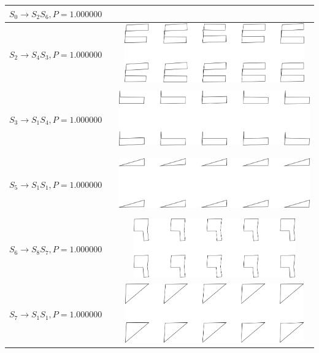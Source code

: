 \begin{tabular}{|l|c|c|}
\hline
$S_{0} \to S_{2} S_{6}, P=1.000000$ &  & \\
\hline
$S_{2} \to S_{4} S_{3}, P=1.000000$ &  & \includegraphics[height=1in]{output/1.models/hand_built/hand/gram.0001.sample.png} \\
\hline
$S_{3} \to S_{1} S_{4}, P=1.000000$ &  & \includegraphics[height=1in]{output/1.models/hand_built/hand/gram.0002.sample.png} \\
\hline
$S_{5} \to S_{1} S_{1}, P=1.000000$ &  & \includegraphics[height=1in]{output/1.models/hand_built/hand/gram.0003.sample.png} \\
\hline
$S_{6} \to S_{8} S_{7}, P=1.000000$ &  & \includegraphics[height=1in]{output/1.models/hand_built/hand/gram.0004.sample.png} \\
\hline
$S_{7} \to S_{1} S_{1}, P=1.000000$ &  & \includegraphics[height=1in]{output/1.models/hand_built/hand/gram.0005.sample.png} \\
\hline
\end{tabular}

